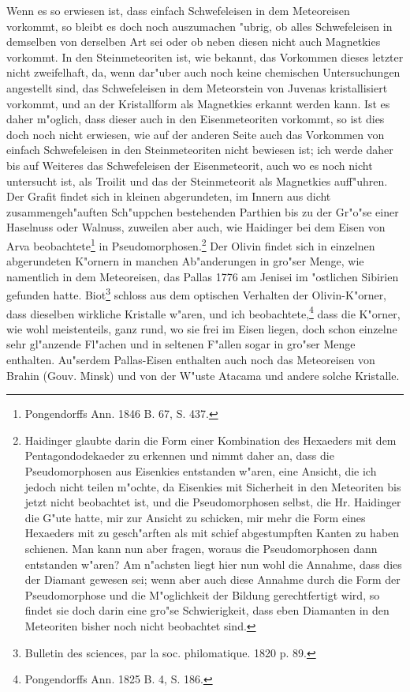 \documentclass[a4paper, 11pt, oneside, german]{article}
\begin{document}
Wenn es so erwiesen ist, dass einfach Schwefeleisen in dem Meteoreisen vorkommt, so bleibt es doch noch auszumachen "ubrig, ob alles Schwefeleisen in demselben von derselben Art sei oder ob neben diesen nicht auch Magnetkies vorkommt. In den Steinmeteoriten ist, wie bekannt, das Vorkommen dieses letzter nicht zweifelhaft, da, wenn dar"uber auch noch keine chemischen Untersuchungen angestellt sind, das Schwefeleisen in dem Meteorstein von Juvenas kristallisiert vorkommt, und an der Kristallform als Magnetkies erkannt werden kann. Ist es daher m"oglich, dass dieser auch in den Eisenmeteoriten vorkommt, so ist dies doch noch nicht erwiesen, wie auf der anderen Seite auch das Vorkommen von einfach Schwefeleisen in den Steinmeteoriten nicht bewiesen ist; ich werde daher bis auf Weiteres das Schwefeleisen der Eisenmeteorit, auch wo es noch nicht untersucht ist, als Troilit und das der Steinmeteorit als Magnetkies auff"uhren. Der Grafit findet sich in kleinen abgerundeten, im Innern aus dicht zusammengeh"auften Sch"uppchen bestehenden Parthien bis zu der Gr"o"se einer Haselnuss oder Walnuss, zuweilen aber auch, wie Haidinger bei dem Eisen von Arva beobachtete\footnote{Pongendorffs Ann. 1846 B. 67, S. 437.} in Pseudomorphosen.\footnote{Haidinger glaubte darin die Form einer Kombination des Hexaeders mit dem Pentagondodekaeder zu erkennen und nimmt daher an, dass die Pseudomorphosen aus Eisenkies entstanden w"aren, eine Ansicht, die ich jedoch nicht teilen m"ochte, da Eisenkies mit Sicherheit in den Meteoriten bis jetzt nicht beobachtet ist, und die Pseudomorphosen selbst, die Hr. Haidinger die G"ute hatte, mir zur Ansicht zu schicken, mir mehr die Form eines Hexaeders mit zu gesch"arften als mit schief abgestumpften Kanten zu haben schienen. Man kann nun aber fragen, woraus die Pseudomorphosen dann entstanden w"aren? Am n"achsten liegt hier nun wohl die Annahme, dass dies der Diamant gewesen sei; wenn aber auch diese Annahme durch die Form der Pseudomorphose und die M"oglichkeit der Bildung gerechtfertigt wird, so findet sie doch darin eine gro"se Schwierigkeit, dass eben Diamanten in den Meteoriten bisher noch nicht beobachtet sind.} Der Olivin findet sich in einzelnen abgerundeten K"ornern in manchen Ab"anderungen in gro"ser Menge, wie namentlich in dem Meteoreisen, das Pallas 1776 am Jenisei im "ostlichen Sibirien gefunden hatte. Biot\footnote{Bulletin des sciences, par la soc. philomatique. 1820 p. 89.} schloss aus dem optischen Verhalten der Olivin-K"orner, dass dieselben wirkliche Kristalle w"aren, und ich beobachtete,\footnote{Pongendorffs Ann. 1825 B. 4, S. 186.} dass die K"orner, wie wohl meistenteils, ganz rund, wo sie frei im Eisen liegen, doch schon einzelne sehr gl"anzende Fl"achen und in seltenen F"allen sogar in gro"ser Menge enthalten. Au"serdem Pallas-Eisen enthalten auch noch das Meteoreisen von Brahin (Gouv. Minsk) und von der W"uste Atacama und andere solche Kristalle.
\end{document}

